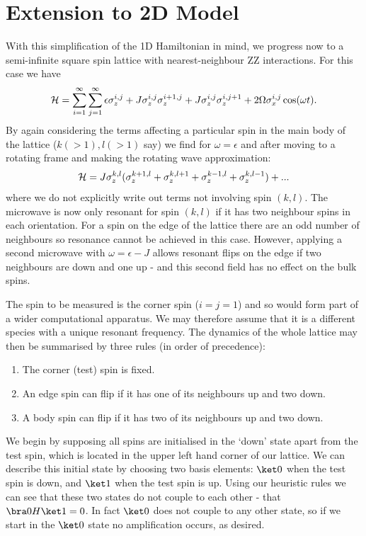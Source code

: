 \section{Extension to 2D Model}

With this simplification of the 1D Hamiltonian in mind, we progress now to a semi-infinite square spin lattice with nearest-neighbour ZZ interactions. For this case we have
\begin{equation} {\cal H} = \sum_{i=1}^{\infty}\sum_{j=1}^\infty
  \epsilon \sigma^{i, j}_z + J \sigma_z^{i, j}\sigma_z^{i+1, j} +
  J\sigma_z^{i, j}\sigma_z^{i, j+1} + 2 \Omega \sigma_x^{i, j}
  \cos(\omega t).
\end{equation}
By again considering the terms affecting a particular spin in the main body of the lattice ($k(>1), l(>1)$ say) we find for $\omega = \epsilon$ and after moving to a rotating frame and making the rotating wave approximation:
\begin{equation}
  {\cal H} = J \sigma_z^{k, l} (\sigma_z^{k+1, l} + \sigma_z^{k, l+1} + \sigma_z^{k-1, l} + \sigma_z^{k, l-1}) +...
\end{equation}
where we do not explicitly write out terms not involving spin $(k, l)$.  The microwave is now only resonant for spin $(k, l)$ if it has two neighbour spins in each orientation. For a spin on the edge of the lattice there are an odd number of neighbours so resonance cannot be achieved in this case. However, applying a second microwave with $\omega = \epsilon - J$ allows resonant flips on the edge if two neighbours are down and one up - and this second field has no effect on the bulk spins.

The spin to be measured is the corner spin ($i=j=1$) and so would form part of a wider computational apparatus. We may therefore assume that it is a different species with a unique resonant frequency. The dynamics of the whole lattice may then be summarised by three rules (in order of precedence):
\begin{enumerate}
  \item The corner (test) spin is fixed.\vspace{-0.2cm}
  \item An edge spin can flip if it has one of its neighbours up and
    two down.\vspace{-0.2cm}
  \item A body spin can flip if it has two of its neighbours up and two down.\vspace{-0.2cm}
\end{enumerate}
We begin by supposing all spins are initialised in the `down' state apart from the test spin, which is located in the upper left hand corner of our lattice. We can describe this initial state by choosing two basis elements: $\ket 0$ when the test spin is down, and $\ket 1$ when the test spin is up. Using our heuristic rules we can see that these two states do not couple to each other - that $\bra 0H\ket 1=0$. In fact $\ket 0$ does not couple to any other state, so if we start in the $\ket 0$ state no amplification occurs, as desired.


